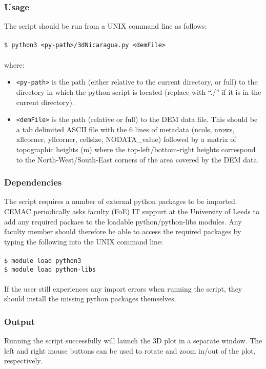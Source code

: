 \documentclass[10pt,a4paper]{article}
\newcommand\tab[1][0.5cm]{\hspace*{#1}}
\begin{document}
\subsubsection{Usage}
The script should be run from a UNIX command line as follows:\\\\
\tab \texttt{\$ python3 <py-path>/3dNicaragua.py <demFile>}\\\\
where:
\begin{itemize}
\item \texttt{<py-path>} is the path (either relative to the current directory, or full) to the directory in which the python script is located (replace with “./” if it is in the current directory).
\item \texttt{<demFile>} is the path (relative or full) to the DEM data file. This should be a tab delimited ASCII file with the 6 lines of metadata (ncols, nrows, xllcorner, yllcorner, cellsize, NODATA\_value) followed by a matrix of topographic heights (m) where the top-left/bottom-right heights correspond to the North-West/South-East corners of the area covered by the DEM data.
\end{itemize}

\subsubsection{Dependencies}
The script requires a number of external python packages to be imported. CEMAC periodically asks faculty (FoE) IT suppurt at the University of Leeds to add any required packaes to the loadable python/python-libs modules. Any faculty member should therefore be able to access the required packages by typing the following into the UNIX command line:\\\\
\tab \texttt{\$ module load python3}\\
\tab \texttt{\$ module load python-libs}\\\\
If the user still experiences any import errors when running the script, they should install the missing python packages themselves.

\subsubsection{Output}
Running the script successfully will launch the 3D plot in a separate window. The left and right mouse buttons can be used to rotate and zoom in/out of the plot, respectively.
\end{document}
